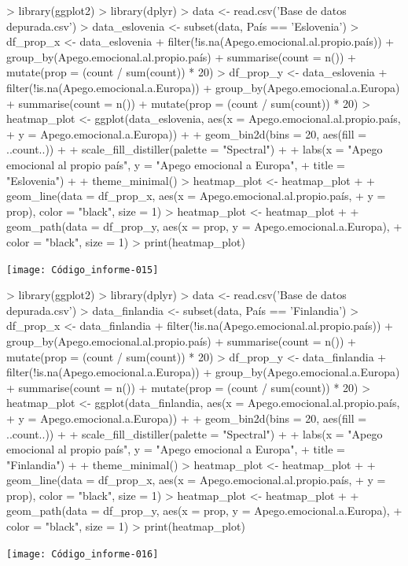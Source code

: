 \documentclass{article}
\begin{document}
\newpage
\begin{Schunk}
\begin{Sinput}
> library(ggplot2)
> library(dplyr)
> data <- read.csv('Base de datos depurada.csv')
> data_eslovenia <- subset(data, País == 'Eslovenia')
> df_prop_x <- data_eslovenia %
+   filter(!is.na(Apego.emocional.al.propio.país)) %
+   group_by(Apego.emocional.al.propio.país) %
+   summarise(count = n()) %
+   mutate(prop = (count / sum(count)) * 20)
> df_prop_y <- data_eslovenia %
+   filter(!is.na(Apego.emocional.a.Europa)) %
+   group_by(Apego.emocional.a.Europa) %
+   summarise(count = n()) %
+   mutate(prop = (count / sum(count)) * 20)
> heatmap_plot <- ggplot(data_eslovenia, aes(x = Apego.emocional.al.propio.país,
+                                  y = Apego.emocional.a.Europa)) +
+   geom_bin2d(bins = 20, aes(fill = ..count..)) +
+   scale_fill_distiller(palette = "Spectral") +
+   labs(x = "Apego emocional al propio país", y = "Apego emocional a Europa",
+        title = "Eslovenia") +
+   theme_minimal()
> heatmap_plot <- heatmap_plot +
+   geom_line(data = df_prop_x, aes(x = Apego.emocional.al.propio.país,
+                                   y = prop), color = "black", size = 1)
> heatmap_plot <- heatmap_plot +
+   geom_path(data = df_prop_y, aes(x = prop, y = Apego.emocional.a.Europa),
+             color = "black", size = 1)
> print(heatmap_plot)
\end{Sinput}
\end{Schunk}
\texttt{[image: Código\_informe-015]}

\newpage
\begin{Schunk}
\begin{Sinput}
> library(ggplot2)
> library(dplyr)
> data <- read.csv('Base de datos depurada.csv')
> data_finlandia <- subset(data, País == 'Finlandia')
> df_prop_x <- data_finlandia %
+   filter(!is.na(Apego.emocional.al.propio.país)) %
+   group_by(Apego.emocional.al.propio.país) %
+   summarise(count = n()) %
+   mutate(prop = (count / sum(count)) * 20)
> df_prop_y <- data_finlandia %
+   filter(!is.na(Apego.emocional.a.Europa)) %
+   group_by(Apego.emocional.a.Europa) %
+   summarise(count = n()) %
+   mutate(prop = (count / sum(count)) * 20)
> heatmap_plot <- ggplot(data_finlandia, aes(x = Apego.emocional.al.propio.país,
+                                  y = Apego.emocional.a.Europa)) +
+   geom_bin2d(bins = 20, aes(fill = ..count..)) +
+   scale_fill_distiller(palette = "Spectral") +
+   labs(x = "Apego emocional al propio país", y = "Apego emocional a Europa",
+        title = "Finlandia") +
+   theme_minimal()
> heatmap_plot <- heatmap_plot +
+   geom_line(data = df_prop_x, aes(x = Apego.emocional.al.propio.país,
+                                   y = prop), color = "black", size = 1)
> heatmap_plot <- heatmap_plot +
+   geom_path(data = df_prop_y, aes(x = prop, y = Apego.emocional.a.Europa),
+             color = "black", size = 1)
> print(heatmap_plot)
\end{Sinput}
\end{Schunk}
\texttt{[image: Código\_informe-016]}
\end{document}

